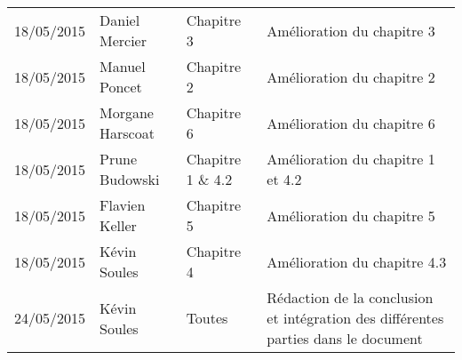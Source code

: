 \small
\begin{tabular}{|p{1.9cm}| >{\raggedright}p{2.5cm}|p{2.5cm}|p{8.5cm}|}
  \hline
  \rowcolor{Gainsboro} \color{Navy}{\bfseries Date}  & \color{Navy}{\bfseries Auteur} & \color{Navy}{\bfseries Section(s)}  &\color{Navy}{\bfseries Commentaires} \\
  \hline
  18/05/2015 & Daniel Mercier & Chapitre 3 & Amélioration du chapitre 3\\
  \hline
  18/05/2015 & Manuel Poncet & Chapitre 2 & Amélioration du chapitre 2\\
  \hline
  18/05/2015 & Morgane Harscoat & Chapitre 6 & Amélioration du chapitre 6\\
  \hline
  18/05/2015 & Prune Budowski & Chapitre 1 \& 4.2 & Amélioration du chapitre 1 et 4.2\\
  \hline
  18/05/2015 & Flavien Keller & Chapitre 5 & Amélioration du chapitre 5\\
  \hline
  18/05/2015 & Kévin Soules & Chapitre 4 & Amélioration du chapitre 4.3\\
  \hline
  24/05/2015 & Kévin Soules & Toutes & Rédaction de la conclusion et intégration des différentes parties dans le document\\
  \hline
\end{tabular}
\normalsize
